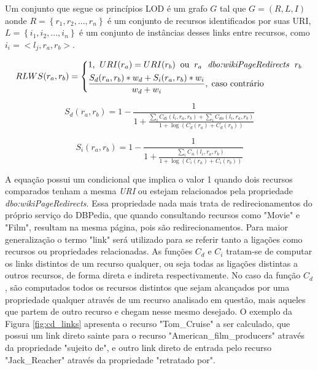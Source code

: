 \begin{definition}
Um conjunto que segue os princípios LOD é um grafo $G$ tal que $G = (R, L, I)$ aonde $R = \left\{r_1, r_2, ..., r_n\right\}$ é um conjunto de recursos identificados por suas URI, $L = \left\{i_1, i_2, ..., i_n\right\}$ é um conjunto de instâncias desses links entre recursos, como $i_i = <l_j, r_a, r_b>$.
\end{definition}

\begin{equation}
	RLWS(r_a, r_b) =
	\begin{dcases*}
		1 \text{,} \;\; URI(r_a) = URI(r_b) \;\; \text{ou} \;\; r_a \; \textit{ dbo:wikiPageRedirects } \; r_b\\
		\frac{S_d(r_a, r_b) * w_d + S_i(r_a, r_b) * w_i}{w_d + w_i}, \; \text{caso contrário}
	\end{dcases*}
\label{eq:rlws}
\end{equation}

\begin{equation}
	S_d(r_a, r_b) = 1 - \frac{1}{1 + \frac{\sum_i C_{di}(l_i, r_a, r_b) + \sum_i C_{do}(l_i, r_a, r_b)}{1 + \log (C_d(r_a) + C_d(r_b))}}
\label{eq:rlws_ex1}
\end{equation}

\begin{equation}
	S_i(r_a, r_b) = 1 - \frac{1}{1 + \frac{\sum_i C_{ii}(l_i, r_a, r_b)}{1 + \log (C_i(r_a) + C_i(r_b))}}
\label{eq:rlws_ex2}
\end{equation}

A equação possui um condicional que implica o valor 1 quando dois recursos comparados tenham a mesma \textit{URI} ou estejam relacionados pela propriedade \textit{dbo:wikiPageRedirects}. Essa propriedade nada mais trata de redirecionamentos do próprio serviço do DBPedia, que quando consultando recursos como "Movie" e "Film", resultam na mesma página, pois são redirecionamentos. Para maior generalização o termo "link" será utilizado para se referir tanto a ligações como recursos ou propriedades relacionadas. As funções $C_d$ e $C_i$ tratam-se de computar os links distintos de um recurso qualquer, ou seja todas as ligações distintas a outros recursos, de forma direta e indireta respectivamente. No caso da função $C_d$, são computados todos os recursos distintos que sejam alcançados por uma propriedade qualquer através de um recurso analisado em questão, mais aqueles que partem de outro recurso e chegam nesse mesmo desejado. O exemplo da Figura \ref{fig:cd_links} apresenta o recurso "Tom\_Cruise" a ser calculado, que possui um link direto sainte para o recurso "American\_film\_producers" através da propriedade "sujeito de", e outro link direto de entrada pelo recurso "Jack\_Reacher" através da propriedade "retratado por".

